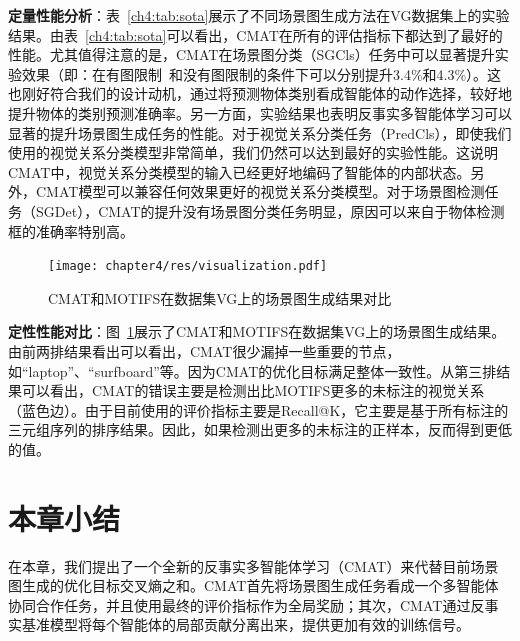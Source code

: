 \textbf{定量性能分析}：表~\ref{ch4:tab:sota}展示了不同场景图生成方法在VG数据集上的实验结果。由表~\ref{ch4:tab:sota}可以看出，CMAT在所有的评估指标下都达到了最好的性能。尤其值得注意的是，CMAT在场景图分类（SGCls）任务中可以显著提升实验效果（即：在有图限制~\cite{zellers2018neural}和没有图限制的条件下可以分别提升3.4\%和4.3\%）。这也刚好符合我们的设计动机，通过将预测物体类别看成智能体的动作选择，较好地提升物体的类别预测准确率。另一方面，实验结果也表明反事实多智能体学习可以显著的提升场景图生成任务的性能。对于视觉关系分类任务（PredCls），即使我们使用的视觉关系分类模型非常简单，我们仍然可以达到最好的实验性能。这说明CMAT中，视觉关系分类模型的输入已经更好地编码了智能体的内部状态。另外，CMAT模型可以兼容任何效果更好的视觉关系分类模型。对于场景图检测任务（SGDet），CMAT的提升没有场景图分类任务明显，原因可以来自于物体检测框的准确率特别高。


\begin{figure}[htbp]
    \centering
    \texttt{[image: chapter4/res/visualization.pdf]}
    \caption{CMAT和MOTIFS在数据集VG上的场景图生成结果对比}
    \label{ch4:fig:visualization}
\end{figure}

\textbf{定性性能对比}：图~\ref{ch4:fig:visualization}展示了CMAT和MOTIFS在数据集VG上的场景图生成结果。由前两排结果看出可以看出，CMAT很少漏掉一些重要的节点，如“laptop”、“surfboard”等。因为CMAT的优化目标满足整体一致性。从第三排结果可以看出，CMAT的错误主要是检测出比MOTIFS更多的未标注的视觉关系（蓝色边）。由于目前使用的评价指标主要是Recall@K，它主要是基于所有标注的三元组序列的排序结果。因此，如果检测出更多的未标注的正样本，反而得到更低的值。



\section{本章小结}

在本章，我们提出了一个全新的反事实多智能体学习（CMAT）来代替目前场景图生成的优化目标交叉熵之和。CMAT首先将场景图生成任务看成一个多智能体协同合作任务，并且使用最终的评价指标作为全局奖励；其次，CMAT通过反事实基准模型将每个智能体的局部贡献分离出来，提供更加有效的训练信号。




